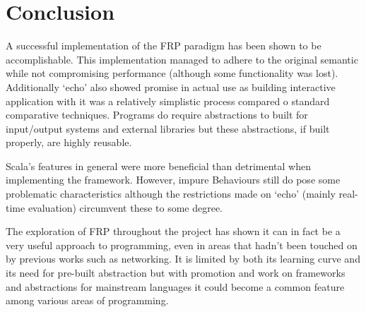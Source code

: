 \chapter{Conclusion}

A successful implementation of the FRP paradigm has been shown to be accomplishable. This implementation
managed to adhere to the original semantic while not compromising performance (although some functionality was
lost). Additionally `echo' also showed promise in actual use as building interactive application with it
was a relatively simplistic process compared o standard comparative techniques. Programs do require abstractions
to built for input/output systems and external libraries but these abstractions, if built properly, are highly
reusable.

Scala's features in general were more beneficial than detrimental when implementing the framework. However,
impure Behaviours still do pose some problematic characteristics although the restrictions made on 
`echo' (mainly real-time evaluation) circumvent these to some degree.

The exploration of FRP throughout the project has shown it can in fact be a very useful approach to programming,
even in areas that hadn't been touched on by previous works such as networking. It is limited by
both its learning curve and its need for pre-built abstraction but with promotion and work on frameworks
and abstractions for mainstream languages it could become a common feature among various areas of programming.